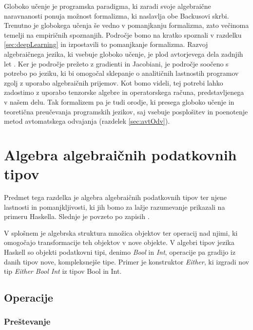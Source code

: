 \documentclass[a4paper, 12pt]{book}
\begin{document}
Globoko učenje je programska paradigma, ki zaradi svoje algebraične naravnanosti ponuja možnost formalizma, ki naslavlja obe Backusovi skrbi. Trenutno je globokega učenja še vedno v pomanjkanju formalizma, zato večinoma temelji na empiričnih spoznanjih. Področje bomo na kratko spoznali v razdelku \ref{sec:deepLearning} in izpostavili to pomanjkanje formalizma.
Razvoj algebraičnega jezika, ki vsebuje globoko učenje, je plod avtorjevega dela zadnjih let \cite{opCalProg} \cite{dC++Paper}. Ker je področje prežeto z gradienti in Jacobiani, je področje soočeno s potrebo po jeziku, ki bi omogočal sklepanje o analitičnih lastnostih programov zgolj z uporabo algebraičnih prijemov. Kot bomo videli, tej potrebi lahko zadostimo z uporabo tenzorske algebre in operatorskega računa, predstavljenega v našem delu.
Tak formalizem pa je tudi orodje, ki presega globoko učenje in teoretična preučevanja programskih jezikov, saj vsebuje posplošitev in poenotenje metod avtomatskega odvajanja (razdelek \ref{sec:avtOdv}).

\section{Algebra algebraičnih podatkovnih tipov}\label{algTp}

Predmet tega razdelka je algebra algebraičnih podatkovnih tipov ter njene lastnosti in pomanjkljivosti, ki jih bomo za lažje razumevanje prikazali na primeru Haskella. Slednje je povzeto po zapisih \cite{algTip}.

V splošnem je algebrska struktura množica objektov ter operacij nad njimi, ki omogočajo transformacije teh objektov v nove objekte. V algebri tipov jezika Haskell so objekti podatkovni tipi, denimo \emph{Bool} in \emph{Int}, operacije pa gradijo iz danih tipov nove, kompleksnejše tipe. Primer je konstruktor \emph{Either}, ki izgradi nov tip \emph{Either Bool Int} iz tipov Bool in Int.

\subsection{Operacije}

\subsubsection{Preštevanje}
\end{document}
